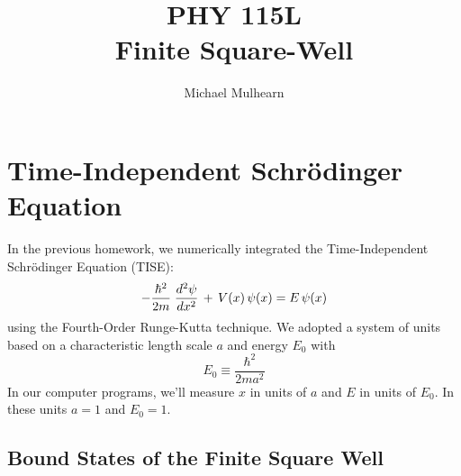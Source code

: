 \documentclass[12pt]{book}
\begin{document}
\newcommand{\ihbar}{\ensuremath{i \hbar}}
\newcommand{\Pss}{\ensuremath{\Psi^*}}
\newcommand{\dPsidt}{\ensuremath{ \frac{\partial \Psi}{\partial t} }}
\newcommand{\dPsidx}{\ensuremath{ \frac{\partial \Psi}{\partial x} }}
\newcommand{\ddPsidx}{\ensuremath{ \frac{\partial^2 \Psi}{\partial x^2} }}
\newcommand{\dPssdt}{\ensuremath{ \frac{\partial \Psi^*}{\partial t} }}
\newcommand{\dPssdx}{\ensuremath{ \frac{\partial \Psi^*}{\partial x} }}
\newcommand{\ddPssdx}{\ensuremath{ \frac{\partial^2 \Psi^*}{\partial x^2} }}

\newcommand{\dphidt}{\ensuremath{ \frac{d \phi}{dt} }}
\newcommand{\dpsidx}{\ensuremath{ \frac{d \psi}{dx} }}
\newcommand{\ddpsidx}{\ensuremath{ \frac{d^2 \psi}{dx^2} }}


\title{PHY 115L \\ Finite Square-Well}
\author{Michael Mulhearn}

\maketitle

\setcounter{chapter}{0}
\chapter{Time-Independent Schr\"odinger Equation}

In the previous homework, we numerically integrated the Time-Independent Schr\"odinger Equation (TISE):
\begin{equation}
- \frac{\hbar^2}{2 m} \; \ddpsidx \, + \, V(x) \, \psi(x) = E \, \psi(x)\\
\end{equation}
using the Fourth-Order Runge-Kutta technique.  We adopted a system of units based on a characteristic length scale $a$ and energy $E_0$ with
\begin{equation}
E_0 \equiv \frac{\hbar^2}{2ma^2}
\end{equation}
In our computer programs, we'll measure $x$ in units of $a$ and $E$ in units of $E_0$.  In these units $a=1$ and $E_0=1$.

\section{Bound States of the Finite Square Well}
\end{document}
